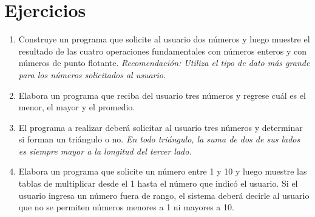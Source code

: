 \documentclass[12pt,spanish,lettersize,twocolumn]{article}
\begin{document}
\section{Ejercicios}
\begin{enumerate}
\item Construye un programa que solicite al usuario dos n\'umeros y luego muestre el resultado de las cuatro operaciones fundamentales con n\'umeros enteros y con n\'umeros de punto flotante. \emph{Recomendaci\'on: Utiliza el tipo de dato m\'as grande para los n\'umeros solicitados al usuario.}
\item Elabora un programa que reciba del usuario tres n\'umeros y regrese cu\'al es el menor, el mayor y el promedio.
\item El programa a realizar deber\'a solicitar al usuario tres n\'umeros y determinar si forman un tri\'angulo o no. \emph{En todo tri\'angulo, la suma de dos de sus lados es siempre mayor a la longitud del tercer lado}.
\item Elabora un programa que solicite un n\'umero entre 1 y 10 y luego muestre las tablas de multiplicar desde el 1 hasta el n\'umero que indic\'o el usuario. Si el usuario ingresa un n\'umero fuera de rango, el sistema deber\'a decirle al usuario que no se permiten n\'umeros menores a 1 ni mayores a 10.
\end{enumerate}
\end{document}
